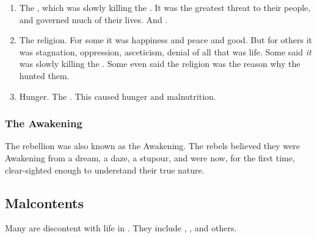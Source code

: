 \begin{enumerate}
  \item 
    The , which was slowly killing the \resphain. 
    It was the greatest threat to their people, and governed much of their lives. 
    And . 
  \item 
    The \Merkyran{} religion.
    For some it was happiness and peace and good. 
    But for others it was stagnation, oppression, asceticism, denial of all that was life. 
    Some said \emph{it} was slowly killing the \resphain.
    Some even said the religion was the reason why the \umbrae{} hunted them. 
  \item 
    Hunger. 
    The . 
    This caused hunger and malnutrition. 
\end{enumerate}





\subsubsection{The Awakening}
The \resphan{} rebellion was also known as the Awakening.
The rebels believed they were Awakening from a dream, a daze, a stupour, and were now, for the first time, clear-sighted enough to understand their true nature. 










\subsection{Malcontents}
Many are discontent with life in \Merkyrah. 
They include \Kezrabal, \Gevural, \Zachirah{} and others. 











